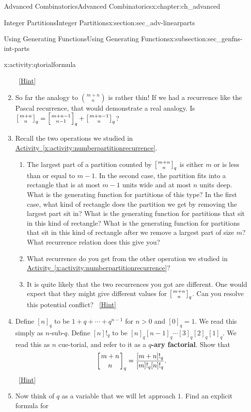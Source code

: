 \documentclass[oneside,10pt,]{book}
\newcommand{\terminology}[1]{\textbf{#1}}
\numberwithin{equation}{chapter}
\newcommand{\qchoose}[2]{\left[{#1\atop#2}\right]_q}
\begin{document}
\begin{chapterptx}{Advanced Combinatorics}{}{Advanced Combinatorics}{}{}{x:chapter:ch_advanced}
\begin{sectionptx}{Integer Partitions}{}{Integer Partitions}{}{}{x:section:sec_adv-linearparts}
\begin{subsectionptx}{Using Generating Functions}{}{Using Generating Functions}{}{}{x:subsection:sec_genfns-int-parts}
\begin{activity}{}{x:activity:qtorialformula}
\begin{enumerate}[font=\bfseries,label=(\alph*),ref=\alph*]
\qquad~\hfill{\tiny\hyperlink{g:hint:idm8138-back}{[Hint]}}\item{}So far the analogy to \(\binom{m+n}{n}\) is rather thin! If we had a recurrence like the Pascal recurrence, that would demonstrate a real analogy. Is \(\qchoose{m+n}{n}= \qchoose{m+n-1}{n-1}+\qchoose{m+n-1}{n}\)?%
\item{}Recall the two operations we studied in \hyperref[x:activity:numberpartitionrecurrence]{Activity~\ref{x:activity:numberpartitionrecurrence}}.%
\begin{enumerate}[font=\bfseries,label=(\roman*),ref=\theenumi.\roman*]
\item{}The largest part of a partition counted by \(\qchoose{m+n}{n}\) is either \(m\) or is less than or equal to \(m-1\).  In the second case, the partition fits into a rectangle that is at most \(m-1\) units wide and at most \(n\) units deep.  What is the generating function for partitions of this type?  In the first case, what kind of rectangle does the partition we get by removing the largest part sit in?  What is the generating function for partitions that sit in this kind of rectangle?  What is the generating function for partitions that sit in this kind of rectangle after we remove a largest part of size \(m\)?  What recurrence relation does this give you?%
\item{}What recurrence do you get from the other operation we studied in \hyperref[x:activity:numberpartitionrecurrence]{Activity~\ref{x:activity:numberpartitionrecurrence}}?%
\item{}It is quite likely that the two recurrences you got are different.  One would expect that they might give different values for \(\qchoose{m+n}{n}\).  Can you resolve this potential conflict?%
\qquad~\hfill{\tiny\hyperlink{g:hint:idm8206-back}{[Hint]}}\end{enumerate}
\item{}Define \([n]_q\) to be \(1+q+\cdots+q^{n-1}\) for \(n>0\) and \([0]_q =1\).  We read this simply as \(n\)-sub-\(q\). Define \([n]!_q\) to be \([n]_q[n-1]_q\cdots [3]_q[2]_q[1]_q\). We read this as \(n\) cue-torial, and refer to it as a \terminology{\(q\)-ary factorial}. Show that%
\begin{equation*}
\qchoose{m+n}{n} = \frac{[m+n]!_q}{[m]!_q[n]!_q}.
\end{equation*}
%
\qquad~\hfill{\tiny\hyperlink{g:hint:idm8232-back}{[Hint]}}\item{}Now think of \(q\) as a variable that we will let approach \(1\). Find an explicit formula for%

\end{enumerate}
\end{activity}
\end{subsectionptx}
\end{sectionptx}
\end{chapterptx}
\end{document}
